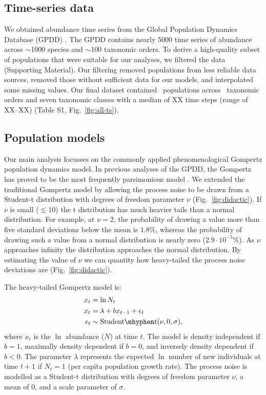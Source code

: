 \subsection{Time-series data}

We obtained abundance time series from the Global Population Dynamics Database (GPDD) \citep{gpdd2010}. The GPDD contains nearly 5000 time series of abundance across $\sim$1000 species and $\sim$100 taxonomic orders. To derive a high-quality subset of populations that were suitable for our analyses, we filtered the data (Supporting Material). Our filtering removed populations from less reliable data sources, removed those without sufficient data for our models, and interpolated some missing values. Our final dataset contained \NPops~populations across \NOrders~taxonomic orders and seven taxonomic classes with a median of XX time steps (range of XX--XX) (Table S1, Fig.~\ref{fig:all-ts}).

\subsection{Population models}

Our main analysis focusses on the commonly applied phenomenological Gompertz population dynamics model. In previous analyses of the GPDD, the Gompertz has proved to be the most frequently parsimonious model \citep{brook2006}. We extended the traditional Gompertz model by allowing the process noise to be drawn from a Student-t distribution with degrees of freedom parameter $\nu$ (Fig.~\ref{fig:didactic}). If $\nu$ is small ($\lesssim 10$) the t distribution has much heavier tails than a normal distribution. For example, at $\nu = 2$, the probability of drawing a value more than five standard deviations below the mean is $1.8$\%, whereas the probability of drawing such a value from a normal distribution is nearly zero ($2.9\cdot10^{-5}$\%). As $\nu$ approaches infinity the distribution approaches the normal distribution. By estimating the value of $\nu$ we can quantity how heavy-tailed the process noise deviations are (Fig.~\ref{fig:didactic}).

The heavy-tailed Gompertz model is: 
\begin{align*}
x_t &= \ln N_t\\
x_t &= \lambda + b x_{t-1} + \epsilon_t\\
\epsilon_t &\sim \mathrm{Student\mhyphen t}(\nu, 0, \sigma),
\end{align*}
where $x_t$ is the $\ln$ abundance ($N$) at time $t$. The model is density independent if $b = 1$, maximally density dependent if $b = 0$, and inversely density dependent if $b < 0$. The parameter $\lambda$ represents the expected $\ln$ number of new individuals at time $t + 1$ if $N_t = 1$ (per capita population growth rate). The process noise is modelled as a Student-t distribution with degrees of freedom parameter $\nu$, a mean of $0$, and a scale parameter of $\sigma$.

